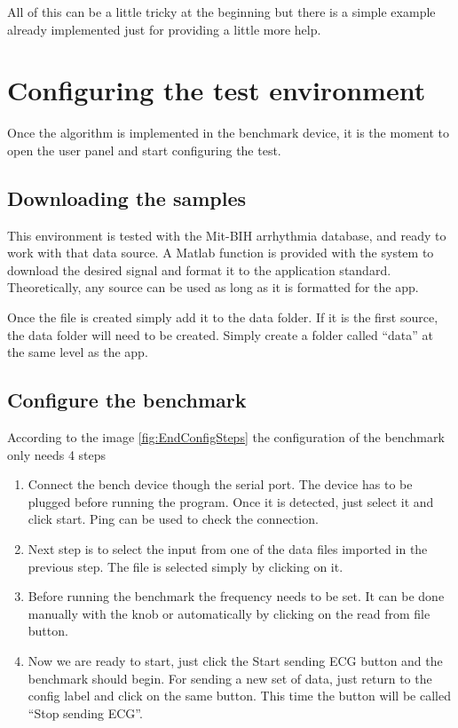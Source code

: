 All of this can be a little tricky at the beginning but there is a simple example already implemented just for providing a little more help.

\clearpage
\section{Configuring the test environment}
Once the algorithm is implemented in the benchmark device, it is the moment to open the user panel and start configuring the test.

\subsection{Downloading the samples}
This environment is tested with the Mit-BIH arrhythmia database, and ready to work with that data source. A Matlab function is provided with the system to download the desired signal and format it to the application standard. Theoretically, any source can be used as long as it is formatted for the app.

Once the file is created simply add it to the data folder. If it is the first source, the data folder will need to be created. Simply create a folder called “data” at the same level as the app.


\subsection{Configure the benchmark}
According to the image \ref{fig:EndConfigSteps} the configuration of the benchmark only needs 4 steps

\begin{enumerate}
    \item Connect the bench device though the serial port. The device has to be plugged before running the program. Once it is detected, just select it and click start. Ping can be used to check the connection.
    \item Next step is to select the input from one of the data files imported in the previous step. The file is selected simply by clicking on it.
    \item Before running the benchmark the frequency needs to be set. It can be done manually with the knob or automatically by clicking on the read from file button.
    \item Now we are ready to start, just click the Start sending ECG button and the benchmark should begin. For sending a new set of data, just return to the config label and click on the same button. This time the button will be called “Stop sending ECG”.
\end{enumerate}

